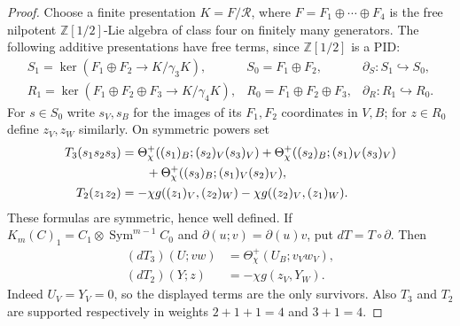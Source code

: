 \documentclass[10pt,a4paper]{amsart}
\theoremstyle{remark}
\newcommand{\R}{\mathbb Z[1/2]}
\newcommand{\Sym}{\operatorname {Sym}}
\begin{document}
\begin{proof}
Choose a finite presentation $K=F/\mathcal R$, where
$F=F_1\oplus\cdots\oplus F_4$ is the free nilpotent $\R$-Lie algebra
of class four on finitely many generators.  The following additive
presentations have free terms, since $\R$ is a PID:
\[
 \begin{array}{lll}
 S_1=\ker(F_1\oplus F_2\to K/\gamma_3K),
   &S_0=F_1\oplus F_2,&\partial_S:S_1\hookrightarrow S_0,\\
 R_1=\ker(F_1\oplus F_2\oplus F_3\to K/\gamma_4K),
   &R_0=F_1\oplus F_2\oplus F_3,&\partial_R:R_1\hookrightarrow R_0.
 \end{array}
\]
For $s\in S_0$ write $s_V,s_B$ for the images of its $F_1,F_2$
coordinates in $V,B$; for $z\in R_0$ define $z_V,z_W$ similarly.
On symmetric powers set
\begin{align}
 T_3(s_1s_2s_3)
   &=\Theta^+_\chi((s_1)_B;(s_2)_V(s_3)_V)
     +\Theta^+_\chi((s_2)_B;(s_1)_V(s_3)_V)\notag\\
   &\qquad+\Theta^+_\chi((s_3)_B;(s_1)_V(s_2)_V),       \label{eq:T3}\\
 T_2(z_1z_2)
   &=-\chi g((z_1)_V,(z_2)_W)
     -\chi g((z_2)_V,(z_1)_W).                         \label{eq:T2}
\end{align}
These formulas are symmetric, hence well defined.  If
$K_m(C)_1=C_1\otimes\Sym^{m-1}C_0$ and
$\partial(u;v)=\partial(u)v$, put $dT=T\circ\partial$.  Then
\begin{align}
 (dT_3)(U;vw)&=\Theta^+_\chi(U_B;v_Vw_V),               \label{eq:dT3}\\
 (dT_2)(Y;z)&=-\chi g(z_V,Y_W).                         \label{eq:dT2}
\end{align}
Indeed $U_V=Y_V=0$, so the displayed terms are the only survivors.
Also $T_3$ and $T_2$ are supported respectively in weights
$2+1+1=4$ and $3+1=4$.


\end{proof}
\end{document}

